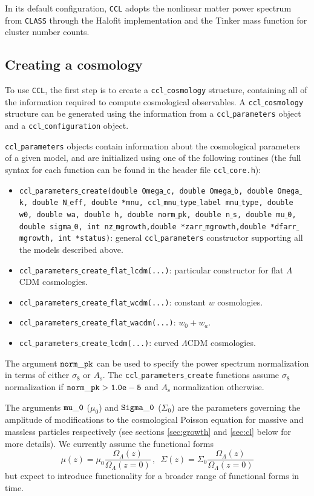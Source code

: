 \documentclass[\docopts]{\docclass}
\newcommand{\ccl}{{\tt CCL}\xspace}
\begin{document}
In its default configuration, \ccl adopts the nonlinear matter power spectrum from {\tt CLASS} through the Halofit implementation and the Tinker mass function for cluster number counts.

\subsection{Creating a cosmology}

To use \ccl, the first step is to create a {\tt ccl$\_$cosmology} structure, containing all of the information required to compute cosmological observables. A {\tt ccl$\_$cosmology} structure can be generated using the information from a {\tt ccl$\_$parameters} object and a {\tt ccl$\_$configuration} object.



{\tt ccl$\_$parameters} objects contain information about the cosmological parameters of a given model, and are initialized using one of the following routines (the full syntax for each function can be found in the header file {\tt ccl$\_$core.h}):
\begin{itemize}
 \item {\tt ccl$\_$parameters$\_$create(double Omega$\_$c, double Omega$\_$b, double Omega$\_$k, double N$\_$eff, double *mnu, ccl$\_$mnu$\_$type$\_$label mnu$\_$type, double w0, double wa, double h, double norm$\_$pk, double n$\_$s, double mu$\_$0, double sigma$\_$0, int nz$\_$mgrowth,double *zarr$\_$mgrowth,double *dfarr$\_$mgrowth, int *status)}: general {\tt ccl$\_$parameters} constructor supporting all the models described above.
 \item {\tt ccl$\_$parameters$\_$create$\_$flat$\_$lcdm(...)}: particular constructor for flat $\Lambda$CDM cosmologies.
 \item {\tt ccl$\_$parameters$\_$create$\_$flat$\_$wcdm(...)}: constant $w$ cosmologies.
 \item {\tt ccl$\_$parameters$\_$create$\_$flat$\_$wacdm(...)}: $w_0+w_a$.
 \item {\tt ccl$\_$parameters$\_$create$\_$lcdm(...)}: curved $\Lambda$CDM cosmologies.
\end{itemize}
The argument ${\tt norm\_pk}$ can be used to specify the power spectrum normalization in terms of either $\sigma_8$ or $A_\mathrm{s}$. The {\tt ccl$\_$parameters$\_$create} functions assume $\sigma_8$ normalization if ${\tt norm\_pk > 1.0e-5}$ and $A_{\mathrm s}$ normalization otherwise.

The arguments ${\tt mu\_0}$ ($\mu_0$) and ${\tt Sigma\_0}$ ($\Sigma_0$) are the parameters governing the amplitude of modifications to the cosmological Poisson equation for massive and massless particles respectively (see sections \ref{sec:growth} and \ref{sec:cl} below for more details). We currently assume the functional forms \citep{Ferreira2010}
\begin{equation}
\mu(z) = \mu_0 \frac{\Omega_\Lambda(z)}{\Omega_\Lambda(z=0)}\, , \,\,\, \Sigma(z) = \Sigma_0 \frac{\Omega_\Lambda(z)}{\Omega_\Lambda(z=0)}
\label{muSigform}
\end{equation}
but expect to introduce functionality for a broader range of functional forms in time.
\end{document}
